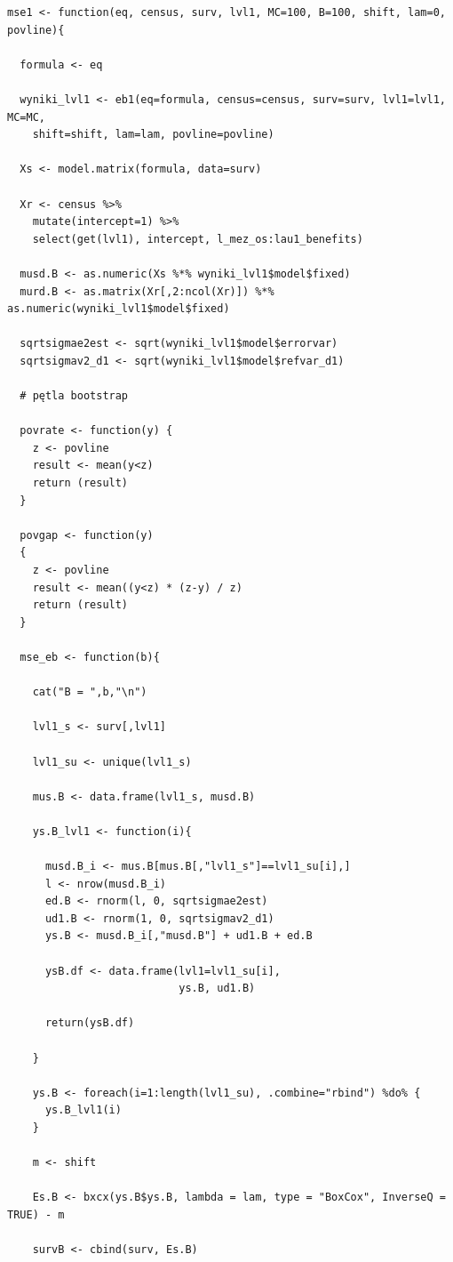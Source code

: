 \begin{verbatim}
mse1 <- function(eq, census, surv, lvl1, MC=100, B=100, shift, lam=0, povline){
  
  formula <- eq
  
  wyniki_lvl1 <- eb1(eq=formula, census=census, surv=surv, lvl1=lvl1, MC=MC, 
  	shift=shift, lam=lam, povline=povline)
  
  Xs <- model.matrix(formula, data=surv)
  
  Xr <- census %>%
    mutate(intercept=1) %>%
    select(get(lvl1), intercept, l_mez_os:lau1_benefits)
  
  musd.B <- as.numeric(Xs %*% wyniki_lvl1$model$fixed)
  murd.B <- as.matrix(Xr[,2:ncol(Xr)]) %*% as.numeric(wyniki_lvl1$model$fixed)
  
  sqrtsigmae2est <- sqrt(wyniki_lvl1$model$errorvar)
  sqrtsigmav2_d1 <- sqrt(wyniki_lvl1$model$refvar_d1)
  
  # pętla bootstrap
  
  povrate <- function(y) {
    z <- povline
    result <- mean(y<z)
    return (result)
  }
  
  povgap <- function(y)     
  {
    z <- povline
    result <- mean((y<z) * (z-y) / z) 
    return (result)
  }
  
  mse_eb <- function(b){
    
    cat("B = ",b,"\n")
    
    lvl1_s <- surv[,lvl1]
    
    lvl1_su <- unique(lvl1_s)
    
    mus.B <- data.frame(lvl1_s, musd.B)
    
    ys.B_lvl1 <- function(i){
      
      musd.B_i <- mus.B[mus.B[,"lvl1_s"]==lvl1_su[i],]
      l <- nrow(musd.B_i)
      ed.B <- rnorm(l, 0, sqrtsigmae2est)
      ud1.B <- rnorm(1, 0, sqrtsigmav2_d1)
      ys.B <- musd.B_i[,"musd.B"] + ud1.B + ed.B
      
      ysB.df <- data.frame(lvl1=lvl1_su[i],
                           ys.B, ud1.B)
      
      return(ysB.df)
      
    }
    
    ys.B <- foreach(i=1:length(lvl1_su), .combine="rbind") %do% {
      ys.B_lvl1(i)
    }
    
    m <- shift
    
    Es.B <- bxcx(ys.B$ys.B, lambda = lam, type = "BoxCox", InverseQ = TRUE) - m
    
    survB <- cbind(surv, Es.B)
    

\end{verbatim}
